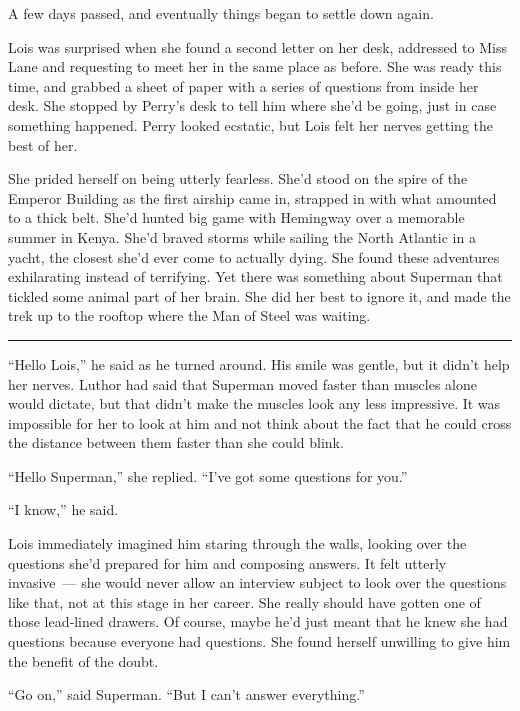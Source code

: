 \documentclass[ebook,12pt]{memoir}
\begin{document}
A few days passed, and eventually things began to settle down again.

Lois was surprised when she found a second letter on her desk, addressed
to Miss Lane and requesting to meet her in the same place as before. She
was ready this time, and grabbed a sheet of paper with a series of
questions from inside her desk. She stopped by Perry's desk to tell him
where she'd be going, just in case something happened. Perry looked
ecstatic, but Lois felt her nerves getting the best of her.

She prided herself on being utterly fearless. She'd stood on the spire
of the Emperor Building as the first airship came in, strapped in with
what amounted to a thick belt. She'd hunted big game with Hemingway over
a memorable summer in Kenya. She'd braved storms while sailing the North
Atlantic in a yacht, the closest she'd ever come to actually dying. She
found these adventures exhilarating instead of terrifying. Yet there was
something about Superman that tickled some animal part of her brain. She
did her best to ignore it, and made the trek up to the rooftop where the
Man of Steel was waiting.

\begin{center}\rule{0.5\linewidth}{0.5pt}\end{center}

``Hello Lois,'' he said as he turned around. His smile was gentle, but
it didn't help her nerves. Luthor had said that Superman moved faster
than muscles alone would dictate, but that didn't make the muscles look
any less impressive. It was impossible for her to look at him and not
think about the fact that he could cross the distance between them
faster than she could blink.

``Hello Superman,'' she replied. ``I've got some questions for you.''

``I know,'' he said.

Lois immediately imagined him staring through the walls, looking over
the questions she'd prepared for him and composing answers. It felt
utterly invasive~--- she would never allow an interview subject to look
over the questions like that, not at this stage in her career. She
really should have gotten one of those lead‐lined drawers. Of course,
maybe he'd just meant that he knew she had questions because everyone
had questions. She found herself unwilling to give him the benefit of
the doubt.

``Go on,'' said Superman. ``But I can't answer everything.''
\end{document}
